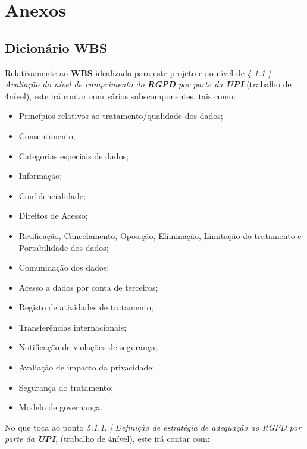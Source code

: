 \section*{Anexos}

\subsection*{Dicionário WBS}

Relativamente ao \textbf{WBS} idealizado para este projeto e ao nível de \textit{4.1.1 | Avaliação do nível de cumprimento do \textbf{RGPD} por parte da \textbf{UPI}} (trabalho de 4\mycirc nível), este irá contar com vários subscomponentes, tais como:

\begin{itemize}
	\item Princípios relativos ao tratamento/qualidade dos dados;
	\item Consentimento;
	\item Categorias especiais de dados;
	\item Informação;
	\item Confidencialidade;
	\item Direitos de Acesso;
	\item Retificação, Cancelamento, Oposição, Eliminação, Limitação do tratamento e Portabilidade dos dados;
	\item Comunidação dos dados;
	\item Acesso a dados por conta de terceiros;
	\item Registo de atividades de tratamento;
	\item Transferências internacionais;
	\item Notificação de violações de segurança;
	\item Avaliação de impacto da privacidade;
	\item Segurança do tratamento;
	\item Modelo de governança.
\end{itemize}

No que toca ao ponto \textit{5.1.1. | Definição de estratégia de adequação ao RGPD por parte da \textbf{UPI}}, (trabalho de 4\mycirc nível), este irá contar com:

